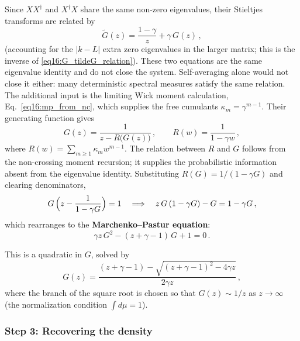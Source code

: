 \documentclass[11pt,letterpaper]{article}
\theoremstyle{plain}
\theoremstyle{definition}
\theoremstyle{remark}
\begin{document}
Since $XX^{\dagger}$ and $X^{\dagger}X$ share the same non-zero eigenvalues,
their Stieltjes transforms are related by
\begin{equation}
  \tilde{G}(z) = \frac{1-\gamma}{z} + \gamma\,G(z)\,,
  \label{eq16:tildeG_from_G}
\end{equation}
(accounting for the $|k - L|$ extra zero eigenvalues in the larger matrix;
this is the inverse of \eqref{eq16:G_tildeG_relation}).  These two equations
are the same eigenvalue identity and do not close the system.  Self-averaging
alone would not close it either: many deterministic spectral measures satisfy
the same relation.  The additional input is the limiting Wick moment
calculation, Eq.~\eqref{eq16:mp_from_nc}, which supplies the free cumulants
$\kappa_m=\gamma^{m-1}$.  Their generating function gives
\begin{equation}
  G(z) = \frac{1}{z - R\bigl(G(z)\bigr)}\,,
  \qquad
  R(w) = \frac{1}{1 - \gamma w}\,,
  \label{eq16:self_consistent}
\end{equation}
where $R(w)=\sum_{m\geq1}\kappa_mw^{m-1}$.  The relation between $R$ and
$G$ follows from the non-crossing moment recursion; it supplies the
probabilistic information absent from the eigenvalue identity.  Substituting $R(G) = 1/(1-\gamma G)$ and
clearing denominators,
\begin{equation}
  G\,\Bigl(z - \frac{1}{1 - \gamma G}\Bigr) = 1
  \quad \Longrightarrow \quad
  z\,G\,(1 - \gamma G) - G = 1 - \gamma G\,,
  \label{eq16:self_consistent_cleared}
\end{equation}
which rearranges to the \textbf{Marchenko--Pastur equation}:
\begin{equation}
  \boxed{\;
  \gamma z\,G^2 - (z + \gamma - 1)\,G + 1 = 0\,.
  \;}
  \label{eq16:mp_quadratic}
\end{equation}

This is a quadratic in $G$, solved by
\begin{equation}
  G(z) = \frac{(z + \gamma - 1)
  - \sqrt{(z + \gamma - 1)^2 - 4\gamma z}}{2\gamma z}\,,
  \label{eq16:mp_stieltjes}
\end{equation}
where the branch of the square root is chosen so that $G(z) \sim 1/z$ as
$z \to \infty$ (the normalization condition $\int d\mu = 1$).

\subsubsection{Step 3: Recovering the density}
\end{document}
